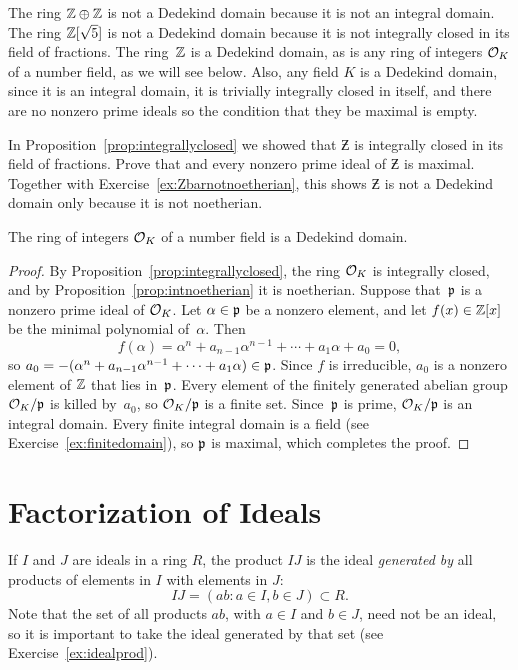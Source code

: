 The ring $\mathbb{Z}\oplus \mathbb{Z}$ is not a Dedekind domain because it is not an
integral domain.  The ring $\mathbb{Z}[\sqrt{5}]$ is not a Dedekind domain
because it is not integrally closed in its field of fractions.  The
ring~$\mathbb{Z}$ is a Dedekind domain, as is any ring of integers $\mathcal{O}_K$ of a
number field, as we will see below.  Also, any field $K$ is a Dedekind
domain, since it is an integral domain, it is trivially integrally
closed in itself, and there are no nonzero prime ideals so the
condition that they be maximal is empty.

\begin{exercise}
	In Proposition~\ref{prop:integrallyclosed} we showed
	that $\Zbar$ is integrally closed in its field of fractions.
	Prove that and every nonzero prime ideal of $\Zbar$
	is maximal. Together with Exercise~\ref{ex:Zbarnotnoetherian},
	this shows $\Zbar$ is not a Dedekind domain only because it
	is not noetherian.
\end{exercise}

\begin{proposition}
The ring of integers $\mathcal{O}_K$ of a number field is a Dedekind domain.
\end{proposition}
\begin{proof}
By Proposition~\ref{prop:integrallyclosed}, the ring $\mathcal{O}_K$ is
integrally closed, and by Proposition~\ref{prop:intnoetherian} it is
noetherian.  Suppose that~$\mathfrak{p}$ is a nonzero prime ideal of $\mathcal{O}_K$.
Let $\alpha\in \mathfrak{p}$ be a nonzero element, and let $f(x)\in\mathbb{Z}[x]$ be the
minimal polynomial of~$\alpha$.  Then
$$f(\alpha)=\alpha^n+a_{n-1}\alpha^{n-1}+\cdots+a_1\alpha+a_0=0,$$ so
$a_0 = -(\alpha^n+a_{n-1}\alpha^{n-1}+\cdots+a_1\alpha)\in \mathfrak{p}$.  Since
$f$ is irreducible, $a_0$ is a nonzero element of $\mathbb{Z}$ that lies
in~$\mathfrak{p}$.  Every element of the finitely generated abelian group
$\mathcal{O}_K/\mathfrak{p}$ is killed by~$a_0$, so $\mathcal{O}_K/\mathfrak{p}$ is a finite set.
Since~$\mathfrak{p}$ is prime, $\mathcal{O}_K/\mathfrak{p}$ is an integral domain.  Every finite
integral domain is a field (see Exercise~\ref{ex:finitedomain}), so
$\mathfrak{p}$ is maximal, which completes the proof.
\end{proof}

\section{Factorization of Ideals}

If $I$ and $J$ are ideals in a ring $R$, the product $IJ$ is the ideal
{\em generated by} all products of elements in $I$ with elements in $J$:
$$
  IJ = (ab : a\in I, b\in J) \subset R.
$$
Note that the set of all products $ab$, with $a\in I$ and $b\in J$,
need not be an ideal, so it is important to take the ideal generated
by that set (see Exercise~\ref{ex:idealprod}).

